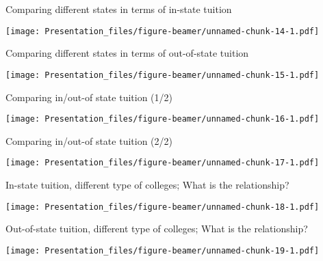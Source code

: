 \documentclass[
  ignorenonframetext,
]{beamer}
\begin{document}
\begin{frame}{Comparing different states in terms of in-state tuition}
\protect\hypertarget{comparing-different-states-in-terms-of-in-state-tuition}{}

\texttt{[image: Presentation\_files/figure-beamer/unnamed-chunk-14-1.pdf]}

\end{frame}

\begin{frame}{Comparing different states in terms of out-of-state
tuition}
\protect\hypertarget{comparing-different-states-in-terms-of-out-of-state-tuition}{}

\texttt{[image: Presentation\_files/figure-beamer/unnamed-chunk-15-1.pdf]}

\end{frame}

\begin{frame}{Comparing in/out-of state tuition (1/2)}
\protect\hypertarget{comparing-inout-of-state-tuition-12}{}

\texttt{[image: Presentation\_files/figure-beamer/unnamed-chunk-16-1.pdf]}

\end{frame}

\begin{frame}{Comparing in/out-of state tuition (2/2)}
\protect\hypertarget{comparing-inout-of-state-tuition-22}{}

\texttt{[image: Presentation\_files/figure-beamer/unnamed-chunk-17-1.pdf]}

\end{frame}

\begin{frame}{In-state tuition, different type of colleges; What is the
relationship?}
\protect\hypertarget{in-state-tuition-different-type-of-colleges-what-is-the-relationship}{}

\texttt{[image: Presentation\_files/figure-beamer/unnamed-chunk-18-1.pdf]}

\end{frame}

\begin{frame}{Out-of-state tuition, different type of colleges; What is
the relationship?}
\protect\hypertarget{out-of-state-tuition-different-type-of-colleges-what-is-the-relationship}{}

\texttt{[image: Presentation\_files/figure-beamer/unnamed-chunk-19-1.pdf]}

\end{frame}
\end{document}
